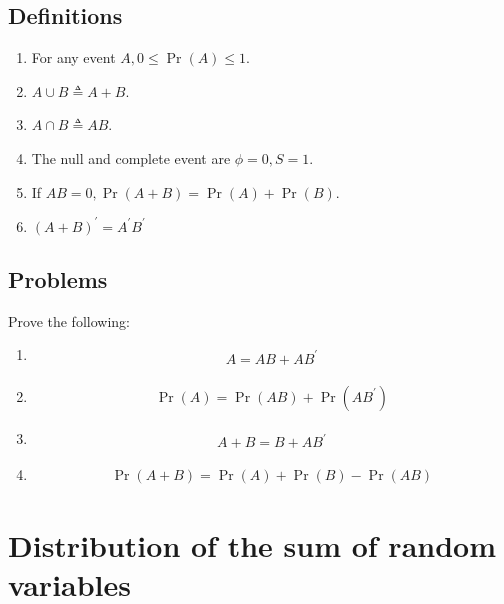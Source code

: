 \documentclass[journal,12pt,onecolumn]{IEEEtran}
\renewcommand\thesection{\arabic{section}}
\renewcommand\thesubsection{\thesection.\arabic{subsection}}
\providecommand{\pr}[1]{\ensuremath{\Pr\left(#1\right)}}
\providecommand{\brak}[1]{\ensuremath{\left(#1\right)}}
\theoremstyle{remark}
\numberwithin{equation}{section}
\begin{document}
\subsection{Definitions}
\begin{enumerate}[label=\arabic*.,ref=\thesubsection.\theenumi]
	\item For any event $A, 0 \le \pr{A} \le 1$.
	\item $A \cup B \triangleq A+B $.
	\item $A \cap B \triangleq AB $.
	\item The null and complete event are $\phi = 0, S = 1$.
	\item If $AB = 0, \pr{A+B} = \pr{A} + \pr{B}$.
	\item $\brak{A+B}^{\prime} = A^{\prime} B^{\prime}$
\end{enumerate}
\subsection{Problems}
Prove the following:
\begin{enumerate}[label=\arabic*.,ref=\thesubsection.\theenumi]
\item 
	\begin{align}
		 A= AB +  AB^{\prime}   
	\end{align}
\item 
	\begin{align}
		\pr{A}= \pr{AB} +  \pr{AB^{\prime}}
	\end{align}
\item 
	\begin{align}
		A + B = B + AB^{\prime}	
	\end{align}
\item 
	\begin{align}
		\pr{A + B} = \pr{A} + \pr{B} -\pr{ AB}
	\end{align}

\end{enumerate}

\section{Distribution of the sum of random variables}
\end{document}

